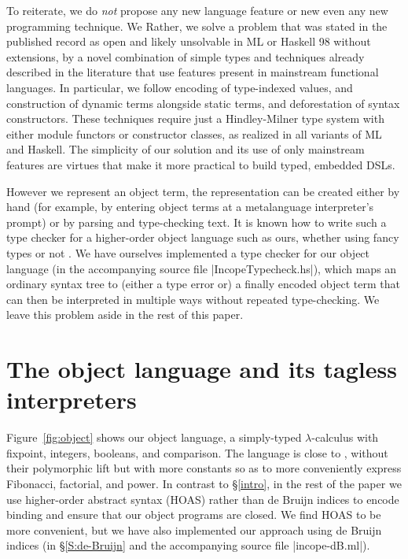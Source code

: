 To reiterate, we do \emph{not} propose any new language
feature or \ifshort new \else even any new programming \fi technique.
\ifshort
We
\else
Rather, we
\fi
solve a problem that was stated in the published record as open and
likely unsolvable in ML or Haskell 98 without extensions, by a novel
combination of simple types and techniques already described in the
literature that use features present in mainstream functional languages.
In particular, we follow  encoding of type-indexed
values,  and 
construction of dynamic terms alongside static terms, and
 deforestation of syntax
constructors.  These techniques require just
a Hindley-Milner type system with either module
functors or constructor classes, as realized in all variants of ML and
Haskell.
The simplicity of our solution and its
use of only mainstream features \ifshort\else are virtues that \fi make it more practical to build typed,
embedded DSLs.

\ifshort\else
However we represent an object term,
the representation can be created either by hand (for example, by
entering object terms at a metalanguage interpreter's prompt) or
by parsing and type-checking text.
It is known how to write such a type checker
for a higher-order object language such as ours,
whether using fancy types \citep{Guillemette-Monier-PLPV,WalidICFP02} or not \citep{baars-typing}.
We have ourselves implemented a type checker for our object
language (in the accompanying source file |IncopeTypecheck.hs|),
which maps an ordinary syntax tree to (either a type error or) a finally
encoded object term that can then be interpreted in multiple ways
without repeated type-checking.  We leave this problem aside in the
rest of this paper.
\fi

\section{The object language and its tagless interpreters}\label{language}

Figure~\ref{fig:object} shows our object language, a simply-typed
$\lambda$-calculus with fixpoint, integers, booleans, and comparison.
The language is close to , without their polymorphic
lift but with more constants so as to more conveniently express Fibonacci,
factorial, and power.
In contrast to \S\ref{intro}, in the rest of the paper 
we use higher-order
abstract syntax (HOAS) \citep{miller-manipulating,pfenning-higher-order}
rather than de Bruijn indices to encode binding and
ensure that our object programs are closed.
We find HOAS to be more convenient, but we have also implemented our
approach using de Bruijn indices
(in \S\ref{S:de-Bruijn} and the accompanying source file
|incope-dB.ml|).


